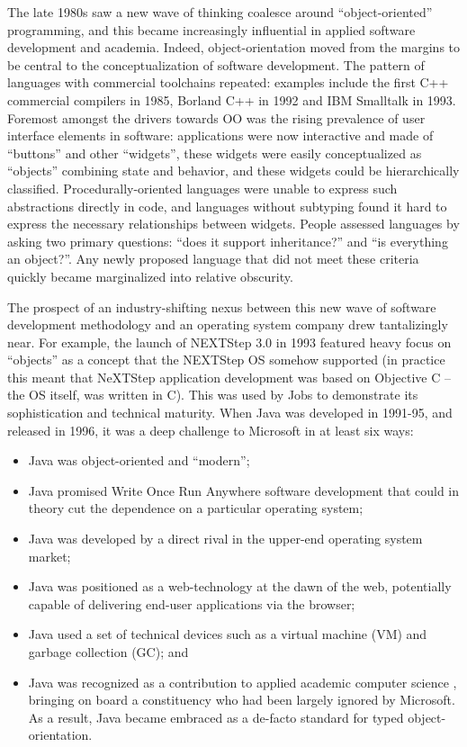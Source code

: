 \documentclass[acmsmall,review]{acmart}\settopmatter{printfolios=true,printccs=false,printacmref=false}
\begin{document}
The late 1980s saw a new wave of thinking coalesce around “object-oriented” programming, and this became increasingly influential in applied software development and academia.  Indeed, object-orientation moved from the margins to be central to the conceptualization of software development.  The pattern of languages with commercial toolchains repeated: examples include the first C++ commercial compilers in 1985, Borland C++ in 1992 and IBM Smalltalk in 1993.   Foremost amongst the drivers towards OO was the rising prevalence of user interface elements in software: applications were now interactive and made of “buttons” and other “widgets”, these widgets were easily conceptualized as “objects” combining state and behavior, and these widgets could be hierarchically classified. Procedurally-oriented languages were unable to express such abstractions directly in code, and languages without subtyping found it hard to express the necessary relationships between widgets. People assessed languages by asking two primary questions: “does it support inheritance?” and “is everything an object?”.  Any newly proposed language that did not meet these criteria quickly became marginalized into relative obscurity. 

The prospect of an industry-shifting nexus between this new wave of software development methodology and an operating system company drew tantalizingly near. For example, the launch of NEXTStep 3.0 in 1993 featured heavy focus on “objects” as a concept that the NEXTStep OS somehow supported (in practice this meant that NeXTStep application development was based on Objective C – the OS itself, was written in C). This was used by Jobs to demonstrate its sophistication and technical maturity. When Java was developed in 1991-95, and released in 1996, it was a deep challenge to Microsoft in at least six ways: 
\begin{itemize}
\item Java was object-oriented and “modern”;
\item Java promised Write Once Run Anywhere software development that could in theory cut the dependence on a particular operating system; 
\item Java was developed by a direct rival in the upper-end operating system market; 
\item Java was positioned as a web-technology at the dawn of the web, potentially capable of delivering end-user applications via the browser;
\item Java used a set of technical devices such as a virtual machine (VM) and garbage collection (GC);  and 
\item Java was recognized as a contribution to applied academic computer science , bringing on board a constituency who had been largely ignored by Microsoft. As a result, Java became embraced as a de-facto standard for typed object-orientation.
\end{itemize}
\end{document}
